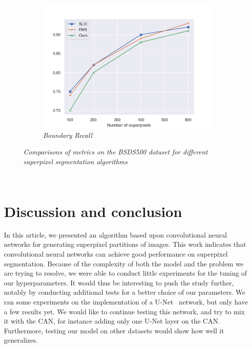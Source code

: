 \documentclass{article}
\begin{document}
\begin{figure}[!ht]
\begin{subfigure}{.49\linewidth}
                \centering
                \includegraphics[width=1.1\linewidth]{pics/BR.png}
            \caption{\textit{Boundary Recall}}
            \end{subfigure}
            \caption{\textit{Comparisons of metrics on the BSDS500 dataset for different superpixel segmentation algorithms}}
            \label{fig:metrics}
        \end{figure}


\newpage
\
\newpage
\section{Discussion and conclusion\label{s5}}
    In this article, we presented an algorithm based upon convolutional neural networks for generating superpixel partitions of images. This work indicates that convolutional neural networks can achieve good performance on superpixel segmentation. Because of the complexity of both the model and the problem we are trying to resolve, we were able to conduct little experiments for the tuning of our hyperparameters. It would thus be interesting to push the study further, notably by conducting additional tests for a better choice of our parameters. We ran some experiments on the implementation of a U-Net~\cite{unet2015} network, but only have a few results yet. We would like to continue testing this network, and try to mix it with the CAN, for instance adding only one U-Net layer on the CAN. Furthermore, testing our model on other datasets would show how well it generalizes.
\end{document}
